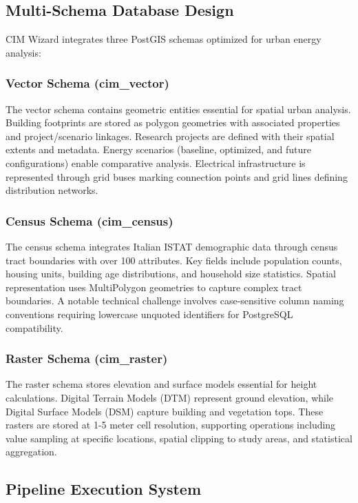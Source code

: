 \subsection{Multi-Schema Database Design}

CIM Wizard integrates three PostGIS schemas optimized for urban energy analysis:

\subsubsection{Vector Schema (cim\_vector)}

The vector schema contains geometric entities essential for spatial urban analysis. Building footprints are stored as polygon geometries with associated properties and project/scenario linkages. Research projects are defined with their spatial extents and metadata. Energy scenarios (baseline, optimized, and future configurations) enable comparative analysis. Electrical infrastructure is represented through grid buses marking connection points and grid lines defining distribution networks.

\subsubsection{Census Schema (cim\_census)}

The census schema integrates Italian ISTAT demographic data through census tract boundaries with over 100 attributes. Key fields include population counts, housing units, building age distributions, and household size statistics. Spatial representation uses MultiPolygon geometries to capture complex tract boundaries. A notable technical challenge involves case-sensitive column naming conventions requiring lowercase unquoted identifiers for PostgreSQL compatibility.

\subsubsection{Raster Schema (cim\_raster)}

The raster schema stores elevation and surface models essential for height calculations. Digital Terrain Models (DTM) represent ground elevation, while Digital Surface Models (DSM) capture building and vegetation tops. These rasters are stored at 1-5 meter cell resolution, supporting operations including value sampling at specific locations, spatial clipping to study areas, and statistical aggregation.

\subsection{Pipeline Execution System}


